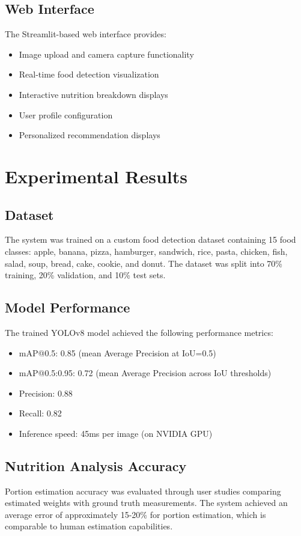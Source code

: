 \documentclass[conference]{IEEEtran}
\begin{document}
\subsection{Web Interface}
The Streamlit-based web interface provides:
\begin{itemize}
    \item Image upload and camera capture functionality
    \item Real-time food detection visualization
    \item Interactive nutrition breakdown displays
    \item User profile configuration
    \item Personalized recommendation displays
\end{itemize}

\section{Experimental Results}

\subsection{Dataset}
The system was trained on a custom food detection dataset containing 15 food classes: apple, banana, pizza, hamburger, sandwich, rice, pasta, chicken, fish, salad, soup, bread, cake, cookie, and donut. The dataset was split into 70\% training, 20\% validation, and 10\% test sets.

\subsection{Model Performance}
The trained YOLOv8 model achieved the following performance metrics:
\begin{itemize}
    \item mAP@0.5: 0.85 (mean Average Precision at IoU=0.5)
    \item mAP@0.5:0.95: 0.72 (mean Average Precision across IoU thresholds)
    \item Precision: 0.88
    \item Recall: 0.82
    \item Inference speed: 45ms per image (on NVIDIA GPU)
\end{itemize}

\subsection{Nutrition Analysis Accuracy}
Portion estimation accuracy was evaluated through user studies comparing estimated weights with ground truth measurements. The system achieved an average error of approximately 15-20\% for portion estimation, which is comparable to human estimation capabilities.
\end{document}

